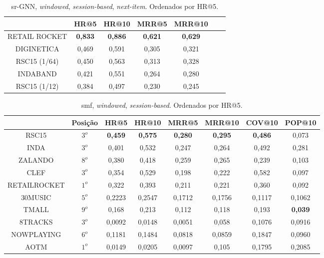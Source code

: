 \begin{table}
    \centering
    \vspace{1mm}
    \begin{tabular}{ccccccc}
    \hline
     & HR@5 & HR@10 & MRR@5 & MRR@10 \\
    \hline
    RETAIL ROCKET & \textbf{0,833} & \textbf{0,886} & \textbf{0,621} & \textbf{0,629} & \\
    DIGINETICA & 0,469 & 0,591 & 0,305 & 0,321 & \\
    RSC15 (1/64) & 0,450 & 0,563 & 0,313 & 0,328 & \\
    INDABAND & 0,421 & 0,551 & 0,264 & 0,280 &  \\
    RSC15 (1/12) & 0,384 & 0,497 & 0,230 & 0,245 & \\
    \hline
    \end{tabular}
    \caption{sr-GNN, \textit{windowed}, \textit{session-based}, \textit{next-item}. Ordenados por HR@5.}
    \label{tab:gnn}
    \end{table}


    \begin{table}
        \centering
        \vspace{1mm}
        \begin{tabular}{cccccccc}
        \hline
        &Posição& HR@5 & HR@10 & MRR@5 & MRR@10 & COV@10 & POP@10 \\
        \hline
        RSC15& $3^o$ & \textbf{0,459} & \textbf{0,575} & \textbf{0,280} & \textbf{0,295} & \textbf{0,486} & 0,073 \\
        INDA& $3^o$ & 0,401 & 0,532 & 0,247 & 0,264 & 0,492 & 0,281 \\
        ZALANDO& $8^o$& 0,380 & 0,418 & 0,259 & 0,265 & 0,239 & 0,103 \\
        CLEF& $3^o$ & 0,354 & 0,529 & 0,198 & 0,222 & 0,582 & 0,097\\
        RETAILROCKET& $1^o$ & 0,322 & 0,393 & 0,211 & 0,221 & 0,360 & 0,092 \\
        30MUSIC& $5^o$ & 0,2223 & 0,2547 & 0,1712 & 0,1756 & 0,1117 & 0,1062 \\
        TMALL& $9^o$& 0,168 &  0,213 & 0,112 & 0,118 & 0,193 & \textbf{0,039} \\
        8TRACKS& $3^o$ & 0,0092 & 0,0148  & 0,0051 & 0,058 & 0,1076 & 0,0916 \\
        NOWPLAYING& $6^o$ & 0,1181 & 0,1484 & 0,0818 & 0,0859 & 0,1847 & 0,0960\\
        AOTM& $1^o$ & 0,0149 & 0,0205 & 0,0097 & 0,105 & 0,1795 & 0,2085\\
        \hline
        \end{tabular}
        \caption{smf, \textit{windowed}, \textit{session-based}. Ordenados por HR@5.}
        \label{tab:smf}
        \end{table}